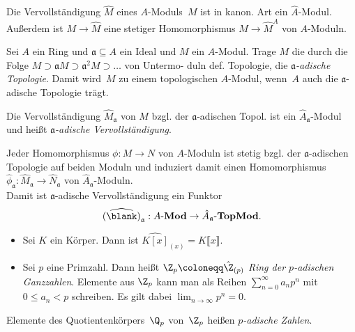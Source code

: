 \documentclass{cheat-sheet}
\newcommand{\Mod}{\mathbf{Mod}} %
\newcommand{\TopMod}{\mathbf{TopMod}} %
\newcommand{\LMod}[1]{{#1}\text{-}\Mod} %
\newcommand{\TopLMod}[1]{{#1}\text{-}\TopMod} %
\newcommand{\aaa}{\mathfrak{a}}
\begin{document}
\begin{bem}
  Die Vervollständigung $\hat{M}$ eines $A$-Moduls~$M$ ist in kanon. Art ein $\hat{A}$-Modul.
  Außerdem ist $M \to \hat{M}$ eine stetiger Homomorphismus $M \to \hat{M}^A$ von $A$-Moduln.
\end{bem}

\begin{konstr}
  Sei $A$ ein Ring und $\aaa \subseteq A$ ein Ideal und $M$ ein $A$-Modul.
  Trage $M$ die durch die Folge $M \supset \aaa M \supset \aaa^2 M \supset \ldots$ von Untermo- duln def. Topologie, die \textit{$\aaa$-adische Topologie}.
  Damit wird~$M$ zu einem topologischen $A$-Modul, wenn~$A$ auch die $\aaa$-adische Topologie trägt.
\end{konstr}

\begin{defn}
  Die Vervollständigung $\hat{M}_\aaa$ von $M$ bzgl. der $\aaa$-adischen Topol. ist ein $\hat{A}_\aaa$-Modul und heißt \emph{$\aaa$-adische Vervollständigung}. %
\end{defn}

\begin{bem}
  Jeder Homomorphismus $\phi : M \to N$ von $A$-Moduln ist stetig bzgl. der $\aaa$-adischen Topologie auf beiden Moduln und induziert damit einen Homomorphismus $\hat{\phi}_\aaa : \hat{M}_\aaa \to \hat{N}_\aaa$ von $\hat{A}_\aaa$-Moduln. \\
  Damit ist $\aaa$-adische Vervollständigung ein Funktor
  \[
    \widehat{(\blank)}_\aaa : \LMod{A} \to \TopLMod{\hat{A}_\aaa}.
  \]
\end{bem}

\begin{bspe}
  \begin{itemize}
    \item Sei $K$ ein Körper.
    Dann ist $\widehat{K[x]}_{(x)} = K \llbracket x \rrbracket$.
    \item Sei $p$ eine Primzahl.
    Dann heißt $\Z_p \coloneqq \hat{\Z}_{(p)}$ \emph{Ring der $p$-adischen Ganzzahlen}.
    Elemente aus $\Z_p$ kann man als Reihen ${\sum}_{n=0}^\infty a_n p^n$ mit $0 \leq a_n < p$ schreiben.
    Es gilt dabei $\lim_{n \to \infty} p^n = 0$.
  \end{itemize}
\end{bspe}

\begin{defn}
  Elemente des Quotientenkörpers~$\Q_p$ von~$\Z_p$ heißen \emph{$p$-adische Zahlen}.
\end{defn}
\end{document}
